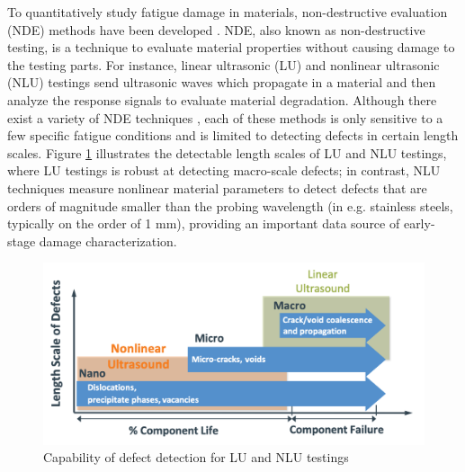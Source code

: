To quantitatively study fatigue damage in materials, non-destructive evaluation (NDE) methods have been developed \cite{nde-review-ACHENBACH200013,nde-review-WISNER2020}. NDE, also known as non-destructive testing, is a technique to evaluate material properties without causing damage to the testing parts. For instance, linear ultrasonic (LU) \cite{nde-lu-fatigue-JOSHI1972577} and nonlinear ultrasonic (NLU) testings \cite{nde-nlu-fatigue-NAGY1998375,nde-nlu-review-Matlack2014,nde-nlu-fatigue-Cantrell} send ultrasonic waves which propagate in a material and then analyze the response signals to evaluate material degradation. Although there exist a variety of NDE techniques 
\cite{nde-thermo-FAN20121, nde-dic, nde-microwave, nde-magnetic, nde-ae-CHAI2017101,nde-electrical-resistance-SUN2007}, each of these methods is only sensitive to a few specific fatigue conditions and is limited to detecting defects in certain length scales. Figure \ref{fig: lu nlu length scales} illustrates the detectable length scales of LU and NLU testings, where LU testings is robust at detecting macro-scale defects; in contrast, NLU techniques measure nonlinear material parameters to detect defects that are orders of magnitude smaller than the probing wavelength (in e.g. stainless steels, typically on the order of 1 mm), providing an important data source of early-stage damage characterization.

\begin{figure}[tb]
    \includegraphics[width=\linewidth]{fig/lu_nlu_length_scales.png}
    \caption{Capability of defect detection for LU and NLU testings}
    \label{fig: lu nlu length scales}
\end{figure}

